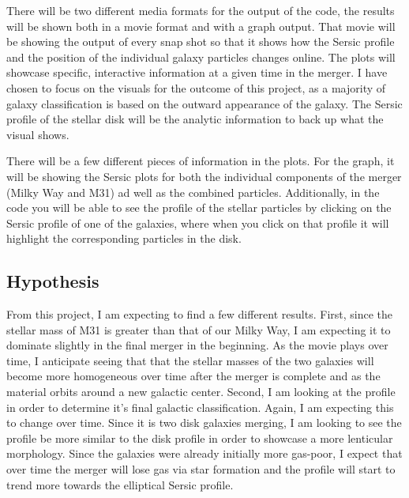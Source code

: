 \documentclass[twocolumn]{aastex63}
\begin{document}
There will be two different media formats for the output of the code, the results will be shown both in a movie format and with a graph output. That movie will be showing the output of every snap shot so that it shows how the Sersic profile and the position of the individual galaxy particles changes online. The plots will showcase specific, interactive information at a given time in the merger. I have chosen to focus on the visuals for the outcome of this project, as a majority of galaxy classification is based on the outward appearance of the galaxy. The Sersic profile of the stellar disk will be the analytic information to back up what the visual shows. 

\medskip

There will be a few different pieces of information in the plots. For the graph, it will be showing the Sersic plots for both the individual components of the merger (Milky Way and M31) ad well as the combined particles. Additionally, in the code you will be able to see the profile of the stellar particles by clicking on the Sersic profile of one of the galaxies, where when you click on that profile it will highlight the corresponding particles in the disk.

\subsection{Hypothesis}
From this project, I am expecting to find a few different results. First, since the stellar mass of M31 is greater than that of our Milky Way, I am expecting it to dominate slightly in the final merger in the beginning. As the movie plays over time, I anticipate seeing that that the stellar masses of the two galaxies will become more homogeneous over time after the merger is complete and as the material orbits around a new galactic center. Second, I am looking at the profile in order to determine it's final galactic classification. Again, I am expecting this to change over time. Since it is two disk galaxies merging, I am looking to see the profile be more similar to the disk profile in order to showcase a more lenticular morphology. Since the galaxies were already initially more gas-poor, I expect that over time the merger will lose gas via star formation and the profile will start to trend more towards the elliptical Sersic profile. 


{}

\end{document}
